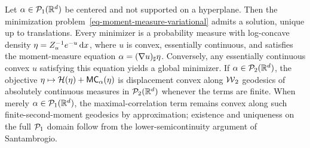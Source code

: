 \begin{prop}\label{prop-moment-hidden-convexity}
Let $\alpha\in\mathcal{P}_1(\mathbb{R}^d)$ be centered and not supported on a hyperplane. Then the minimization problem~\eqref{eq-moment-measure-variational} admits a solution, unique up to translations. Every minimizer is a probability measure with log-concave density $\eta=Z_u^{-1}e^{-u}\,\mathrm{d} x$, where $u$ is convex, essentially continuous, and satisfies the moment-measure equation $\alpha=(\nabla u)_\sharp \eta$.
Conversely, any essentially continuous convex $u$ satisfying this equation yields a global minimizer. If $\alpha\in\mathcal{P}_2(\mathbb{R}^d)$, the objective $\eta\mapsto\mathcal H(\eta)+\mathsf{MC}_\alpha(\eta)$ is displacement convex along $\operatorname{\mathcal{W}}_2$ geodesics of absolutely continuous measures in $\mathcal{P}_2(\mathbb{R}^d)$ whenever the terms are finite. When merely $\alpha\in\mathcal{P}_1(\mathbb{R}^d)$, the maximal-correlation term remains convex along such finite-second-moment geodesics by approximation; existence and uniqueness on the full $\mathcal{P}_1$ domain follow from the lower-semicontinuity argument of Santambrogio.
\end{prop}
